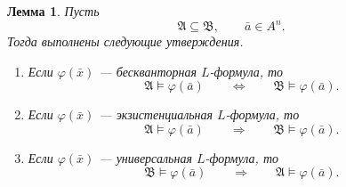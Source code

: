 \documentclass[12pt,a4paper,oneside,openany]{book}
\theoremstyle{definition}
\theoremstyle{plain}
\newtheorem{lemma}{Лемма}[chapter]
\theoremstyle{remark}
\begin{document}
\begin{lemma}
Пусть
\[
\mathfrak A\subseteq \mathfrak B,
\qquad
\bar a\in A^n.
\]
Тогда выполнены следующие утверждения.

\begin{enumerate}
    \item Если $\varphi(\bar x)$ — бескванторная $L$-формула, то
    \[
    \mathfrak A\models\varphi(\bar a)
    \qquad
    \Longleftrightarrow
    \qquad
    \mathfrak B\models\varphi(\bar a).
    \]

    \item Если $\varphi(\bar x)$ — экзистенциальная $L$-формула, то
    \[
    \mathfrak A\models\varphi(\bar a)
    \qquad
    \Longrightarrow
    \qquad
    \mathfrak B\models\varphi(\bar a).
    \]

    \item Если $\varphi(\bar x)$ — универсальная $L$-формула, то
    \[
    \mathfrak B\models\varphi(\bar a)
    \qquad
    \Longrightarrow
    \qquad
    \mathfrak A\models\varphi(\bar a).
    \]
\end{enumerate}
\end{lemma}
\end{document}
